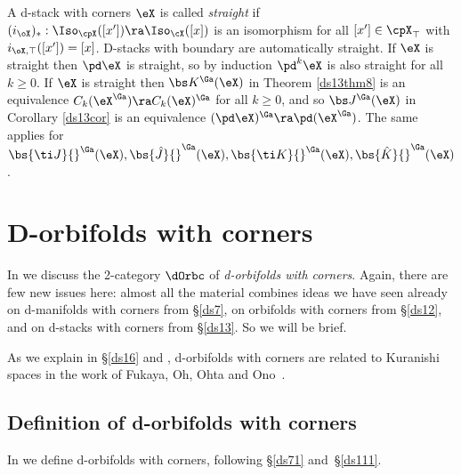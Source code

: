 \documentclass{article}
\begin{document}
A d-stack with corners $\eX$ is called {\it straight\/} if
$(i_\oX)_*:\Iso_\cpX([x'])\ra\Iso_\cX([x])$ is an isomorphism for
all $[x']\in\cpX_\top$ with $i_{\oX,\top}([x'])=[x]$. D-stacks with
boundary are automatically straight. If
$\eX$ is straight then $\pd\eX$ is straight, so by induction
$\pd^k\eX$ is also straight for all $k\ge 0$. If $\eX$ is straight
then $\bs K^\Ga(\eX)$ in Theorem \ref{ds13thm8} is an equivalence
$C_k(\eX^\Ga)\ra C_k(\eX)^\Ga$ for all $k\ge 0$, and so $\bs
J{}^\Ga(\eX)$ in Corollary \ref{ds13cor} is an equivalence
$(\pd\eX)^\Ga\ra \pd(\eX^\Ga)$. The same applies for~$\bs{\ti
J}{}^\Ga(\eX),\bs{\hat J}{}^\Ga(\eX),\bs{\ti K}{}^\Ga(\eX),\bs{\hat
K}{}^\Ga(\eX)$.

\section{D-orbifolds with corners}
\label{ds14}

In \cite[Chap.~12]{Joyc6} we discuss the 2-category $\dOrbc$ of {\it
d-orbifolds with corners}. Again, there are few new issues here:
almost all the material combines ideas we have seen already on
d-manifolds with corners from \S\ref{ds7}, on orbifolds with corners
from \S\ref{ds12}, and on d-stacks with corners from \S\ref{ds13}.
So we will be brief.

As we explain in \S\ref{ds16} and \cite[\S 14.3]{Joyc6}, d-orbifolds
with corners are related to Kuranishi spaces in the work of Fukaya, Oh, Ohta and Ono~\cite{FOOO}.

\subsection{Definition of d-orbifolds with corners}
\label{ds141}

In \cite[\S 12.1]{Joyc6} we define d-orbifolds with corners,
following \S\ref{ds71} and~\S\ref{ds111}.
\end{document}
